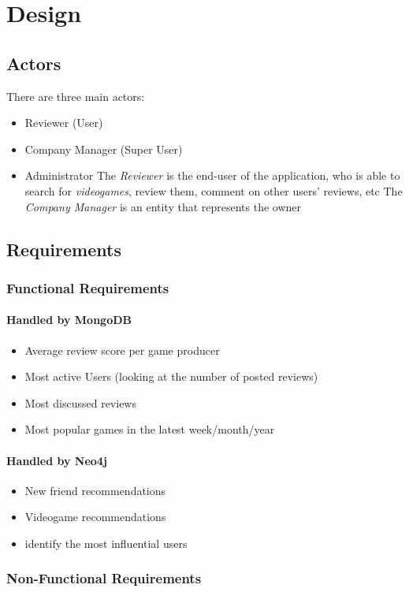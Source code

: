 \chapter{Design}
\section{Actors}

There are three main actors: 
\begin{itemize}
	\item Reviewer (User)
	\item Company Manager (Super User)
	\item Administrator 
	The \emph{Reviewer} is the end-user of the application, who is able to search for \emph{videogames}, review them, comment on other users' reviews, etc 
	The \emph{Company Manager} is an entity that represents the owner 
\end{itemize}
\section{Requirements}
\subsection{Functional Requirements}
\subsubsection{Handled by MongoDB}
\begin{itemize}
	\item Average review score per game producer 
	\item Most active Users (looking at the number of posted reviews)
	\item Most discussed reviews 
	\item Most popular games in the latest week/month/year 
\end{itemize}
\subsubsection{Handled by Neo4j}
\begin{itemize}
	\item New friend recommendations 
	\item Videogame recommendations 
	\item identify the most influential users 
\end{itemize}
\subsection{Non-Functional Requirements}
